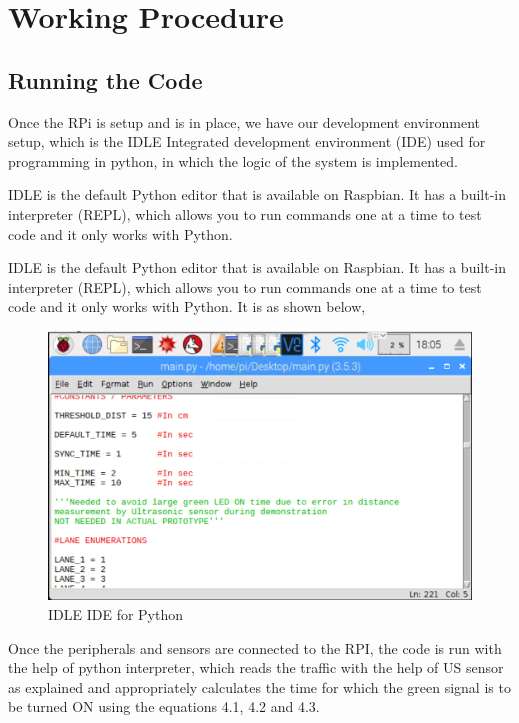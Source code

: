 \pagebreak

\section{Working Procedure}

\subsection{Running the Code}

Once the RPi is setup and is in place, we have our development environment setup, which is the IDLE Integrated development environment (IDE) used for programming in python, in which the logic of the system is implemented.

IDLE is the default Python editor that is available on Raspbian. It has a built-in interpreter (REPL), which allows you to run commands one at a time to test code and it only works with Python.

IDLE is the default Python editor that is available on Raspbian. It has a built-in interpreter (REPL), which allows you to run commands one at a time to test code and it only works with Python. It is as shown below,

\begin{figure}[h]\centering
\includegraphics[width=5.5in]{./images/RunningCode.png}
\caption{IDLE IDE for Python}\label{RunningCode}
\end{figure}

Once the peripherals and sensors are connected to the RPI, the code is run with the help of python interpreter, which reads the traffic with the help of US sensor as explained and appropriately calculates the time for which the green signal is to be turned ON using the equations 4.1, 4.2 and 4.3.

